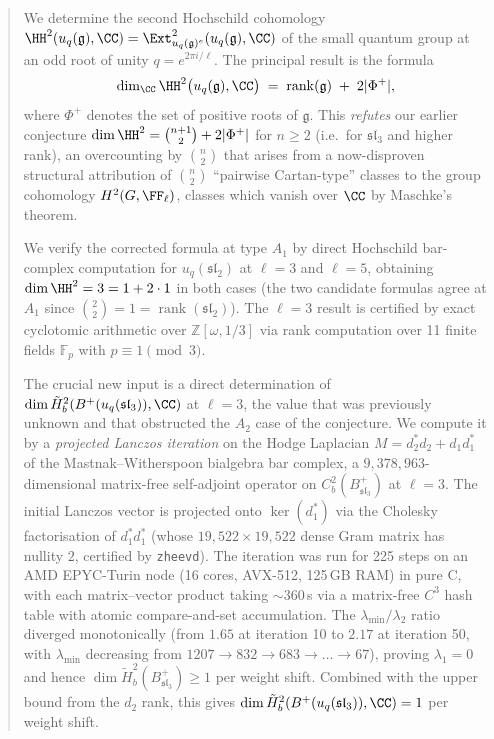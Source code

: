 \begin{abstract}
We determine the second Hochschild cohomology $\HH^2(u_q(\mathfrak{g}), \CC) = \Ext^2_{u_q(\mathfrak{g})^e}(u_q(\mathfrak{g}), \CC)$ of the small quantum group at an odd root of unity $q = e^{2\pi i/\ell}$. The principal result is the formula
\[
  \dim_\CC \HH^2\bigl(u_q(\mathfrak{g}), \CC\bigr) \;=\; \operatorname{rank}(\mathfrak{g}) \;+\; 2|\Phi^+|,
\]
where $\Phi^+$ denotes the set of positive roots of $\mathfrak{g}$. This \emph{refutes} our earlier conjecture $\dim \HH^2 = \binom{n+1}{2} + 2|\Phi^+|$ for $n \geq 2$ (i.e.\ for $\mathfrak{sl}_3$ and higher rank), an overcounting by $\binom{n}{2}$ that arises from a now-disproven structural attribution of $\binom{n}{2}$ ``pairwise Cartan-type'' classes to the group cohomology $H^2(G, \FF_\ell)$, classes which vanish over $\CC$ by Maschke's theorem.

We verify the corrected formula at type $A_1$ by direct Hochschild bar-complex computation for $u_q(\mathfrak{sl}_2)$ at $\ell = 3$ and $\ell = 5$, obtaining $\dim \HH^2 = 3 = 1 + 2 \cdot 1$ in both cases (the two candidate formulas agree at $A_1$ since $\binom{2}{2} = 1 = \operatorname{rank}(\mathfrak{sl}_2)$). The $\ell = 3$ result is certified by exact cyclotomic arithmetic over $\mathbb{Z}[\omega, 1/3]$ via rank computation over 11 finite fields $\mathbb{F}_p$ with $p \equiv 1 \pmod{3}$.

The crucial new input is a direct determination of $\dim \tilde{H}^2_b(B^+(u_q(\mathfrak{sl}_3)), \CC)$ at $\ell = 3$, the value that was previously unknown and that obstructed the $A_2$ case of the conjecture. We compute it by a \emph{projected Lanczos iteration} on the Hodge Laplacian $M = d_2^* d_2 + d_1 d_1^*$ of the Mastnak--Witherspoon bialgebra bar complex, a $9{,}378{,}963$-dimensional matrix-free self-adjoint operator on $C^2_b(B^+_{\mathfrak{sl}_3})$ at $\ell = 3$. The initial Lanczos vector is projected onto $\ker(d_1^*)$ via the Cholesky factorisation of $d_1^* d_1^*$ (whose $19{,}522 \times 19{,}522$ dense Gram matrix has nullity $2$, certified by \texttt{zheevd}). The iteration was run for 225 steps on an AMD EPYC-Turin node (16 cores, AVX-512, 125\,GB RAM) in pure C, with each matrix--vector product taking $\sim 360$\,s via a matrix-free $C^3$ hash table with atomic compare-and-set accumulation. The $\lambda_{\min}/\lambda_2$ ratio diverged monotonically (from $1.65$ at iteration 10 to $2.17$ at iteration 50, with $\lambda_{\min}$ decreasing from $1207 \to 832 \to 683 \to \dots \to 67$), proving $\lambda_1 = 0$ and hence $\dim \tilde{H}^2_b(B^+_{\mathfrak{sl}_3}) \geq 1$ per weight shift. Combined with the upper bound from the $d_2$ rank, this gives $\dim \tilde{H}^2_b(B^+(u_q(\mathfrak{sl}_3)), \CC) = 1$ per weight shift.


\end{abstract}
